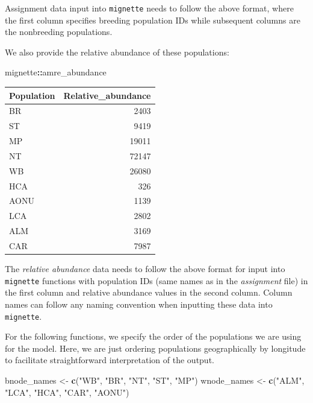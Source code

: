 \documentclass[
]{book}
\newenvironment{Shaded}{\begin{snugshade}}{\end{snugshade}}
\newcommand{\FunctionTok}[1]{\textcolor[rgb]{0.13,0.29,0.53}{\textbf{#1}}}
\newcommand{\NormalTok}[1]{#1}
\newcommand{\OtherTok}[1]{\textcolor[rgb]{0.56,0.35,0.01}{#1}}
\newcommand{\SpecialCharTok}[1]{\textcolor[rgb]{0.81,0.36,0.00}{\textbf{#1}}}
\newcommand{\StringTok}[1]{\textcolor[rgb]{0.31,0.60,0.02}{#1}}
\begin{document}
Assignment data input into \texttt{mignette} needs to follow the above format, where the first column specifies breeding population IDs while subsequent columns are the nonbreeding populations.

We also provide the relative abundance of these populations:

\begin{Shaded}
\begin{Highlighting}[]
\NormalTok{mignette}\SpecialCharTok{::}\NormalTok{amre\_abundance}
\end{Highlighting}
\end{Shaded}

\begin{tabular}{l|r}
\hline
Population & Relative\_abundance\\
\hline
BR & 2403\\
\hline
ST & 9419\\
\hline
MP & 19011\\
\hline
NT & 72147\\
\hline
WB & 26080\\
\hline
HCA & 326\\
\hline
AONU & 1139\\
\hline
LCA & 2802\\
\hline
ALM & 3169\\
\hline
CAR & 7987\\
\hline
\end{tabular}

The \emph{relative abundance} data needs to follow the above format for input into \texttt{mignette} functions with population IDs (same names as in the \emph{assignment} file) in the first column and relative abundance values in the second column. Column names can follow any naming convention when inputting these data into \texttt{mignette}.

For the following functions, we specify the order of the populations we are using for the model. Here, we are just ordering populations geographically by longitude to facilitate straightforward interpretation of the output.

\begin{Shaded}
\begin{Highlighting}[]
\NormalTok{bnode\_names }\OtherTok{\textless{}{-}} \FunctionTok{c}\NormalTok{(}\StringTok{"WB"}\NormalTok{, }\StringTok{"BR"}\NormalTok{, }\StringTok{"NT"}\NormalTok{, }\StringTok{"ST"}\NormalTok{, }\StringTok{"MP"}\NormalTok{)}
\NormalTok{wnode\_names }\OtherTok{\textless{}{-}} \FunctionTok{c}\NormalTok{(}\StringTok{"ALM"}\NormalTok{, }\StringTok{"LCA"}\NormalTok{, }\StringTok{"HCA"}\NormalTok{, }\StringTok{"CAR"}\NormalTok{, }\StringTok{"AONU"}\NormalTok{)}
\end{Highlighting}
\end{Shaded}
\end{document}
